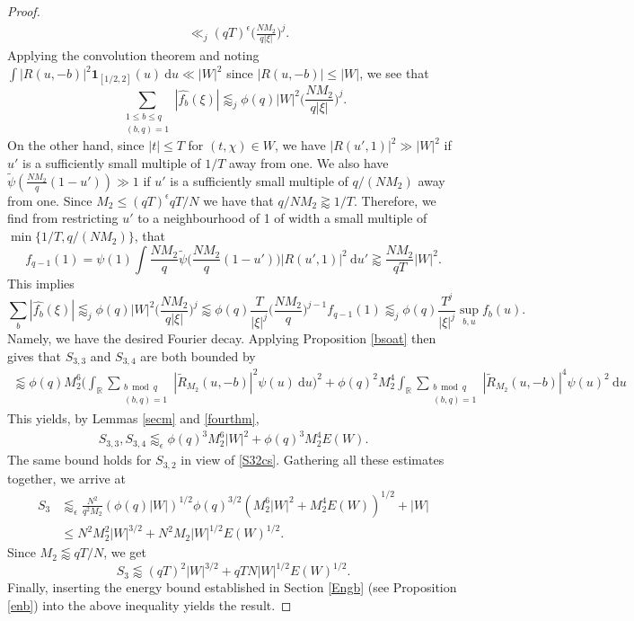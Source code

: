 \documentclass[12pt]{amsart}
\theoremstyle{definition}
\theoremstyle{plain}
\theoremstyle{remark}
\numberwithin{equation}{section}
\numberwithin{theorem}{section}
\numberwithin{equation}{section}
\begin{document}
\begin{proof}
\begin{align*}
			&\ll_{j}(qT)^{\epsilon}\bigg(\frac{NM_{2}}{q|\xi|}\bigg)^{j}.
		\end{align*}
		Applying the convolution theorem and noting $\int |R(u, -b)|^{2}\mathbf{1}_{[1/2, 2]}(u)\:\mathrm{d}u \ll |W|^{2}$ since $|R(u,-b)|\leq|W|$, we see that 
		\[\sum_{\substack{1 \leq b\leq q \\ (b,q)=1}}|\hat{f_{b}}(\xi)| \lessapprox_{j} \phi(q)|W|^{2}\bigg(\frac{NM_{2}}{q|\xi|}\bigg)^{j}.\]
		On the other hand, since $|t| \leq T$ for $(t, \chi) \in W$, we have $|R(u', 1)|^{2} \gg |W|^{2}$ if $u'$ is a sufficiently small multiple of $1/T$ away from one. We also have $\tilde{\psi}(\frac{NM_{2}}{q}(1-u')) \gg 1$ if $u'$ is a sufficiently small multiple of $q/(NM_{2})$ away from one. Since $M_{2}\leq (qT)^{\epsilon}qT/N$ we have that $q/NM_2 \gtrapprox 1/T$. Therefore, we find from restricting $u'$ to a neighbourhood of 1 of width a small multiple of $\min\{1/T, q/(NM_{2})\}$, that
		\[
		f_{q-1}(1)=\psi(1)\int\limits\frac{NM_{2}}{q}\tilde{\psi}\bigg(\frac{NM_{2}}{q}(1-u')\bigg)| R(u', 1)|^{2}
		\:\mathrm{d}u'\gtrapprox \frac{NM_{2}}{qT}|W|^{2}.
		\]
		This implies 
		\[\sum_{b}|\hat{f_{b}}(\xi)| \lessapprox_{j} \phi(q)|W|^{2}\bigg(\frac{NM_{2}}{q|\xi|}\bigg)^{j} \lessapprox \phi(q)\frac{T}{|\xi|^{j}}\bigg(\frac{NM_{2}}{q}\bigg)^{j-1}f_{q-1}(1)\lessapprox_{j} \phi(q)\frac{T^{j}}{|\xi|^{j}}\sup_{b,u}f_{b}(u).
		\]
		Namely, we have the desired Fourier decay. Applying Proposition \ref{bsoat} then gives that $S_{3,3}$ and $S_{3,4}$ are both bounded by
		\begin{align*}
			\lessapprox \phi(q) M_{2}^{6}\bigg(\int_{\mathbb{R}}\sum_{\substack{b \bmod q \\ (b, q)=1}}|\tilde{R}_{M_{2}}(u, -b)|^{2}\psi(u)\:\mathrm{d}u\bigg)^{2}+\phi(q)^{2} M_{2}^{4}\int_{\mathbb{R}}\sum_{\substack{b \bmod q \\ (b, q)=1}}|\tilde{R}_{M_{2}}(u, -b)|^{4}\psi(u)^{2}\:\mathrm{d}u
		\end{align*} 
		This yields, by Lemmas \ref{secm} and \ref{fourthm}, 
		\begin{align*}
			S_{3,3}, S_{3,4}\lessapprox_{\epsilon} \phi(q)^{3} M_{2}^{6}|W|^{2}+
			\phi(q)^{3} M_{2}^{4}E(W).
		\end{align*} 
		The same bound holds for $S_{3,2}$ in view of \eqref{S32cs}. Gathering all these estimates together, we arrive at
		\begin{align*}
			S_{3}&\lessapprox_{\epsilon} \frac{N^{2}}{q^{2}M_{2}}(\phi(q)|W|)^{1/2}\phi(q)^{3/2}(M_{2}^{6}|W|^{2}+M_{2}^{4}E(W))^{1/2}+|W|
			\\
			&\leq N^{2}M_{2}^{2}|W|^{3/2}+N^{2}M_{2}|W|^{1/2}E(W)^{1/2}.
		\end{align*} 
		Since $M_{2}\lessapprox qT/N$, we get
		\begin{equation} \label{S3p}
			S_{3}\lessapprox (qT)^{2}|W|^{3/2}+qTN|W|^{1/2}E(W)^{1/2}.
		\end{equation}
		Finally, inserting the energy bound established in Section \ref{Engb} (see Proposition \ref{enb}) into the above inequality yields the result. 
	\end{proof}
	
\end{document}

